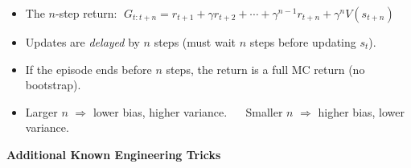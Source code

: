\documentclass[11pt]{article}
\providecommand{\tightlist}{%
      \setlength{\itemsep}{0pt}\setlength{\parskip}{0pt}}
\begin{document}
\begin{itemize}
\tightlist
\item
  The \(n\)-step return:
  \(\;G_{t:t+n} = r_{t+1} + \gamma r_{t+2} + \cdots + \gamma^{n-1} r_{t+n} + \gamma^n V(s_{t+n})\)
\item
  Updates are \emph{delayed} by \(n\) steps (must wait \(n\) steps
  before updating \(s_t\)).
\item
  If the episode ends before \(n\) steps, the return is a full MC return
  (no bootstrap).
\item
  Larger \(n\) \(\Rightarrow\) lower bias, higher variance. \(\quad\)
  Smaller \(n\) \(\Rightarrow\) higher bias, lower variance.
\end{itemize}

    \label{tricks-2-3}

    \textbf{Additional Known Engineering Tricks}
\end{document}
